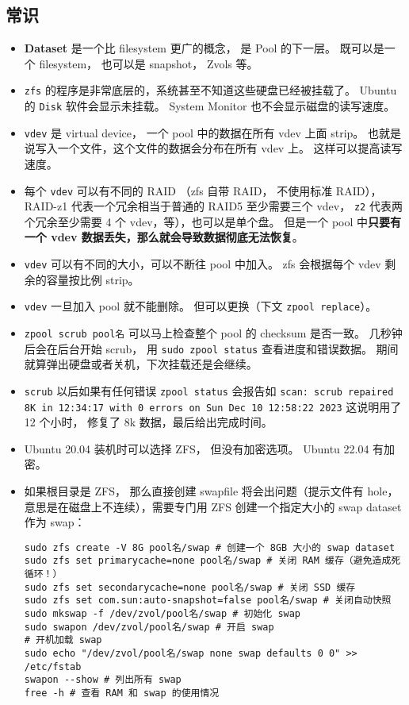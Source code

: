 \subsection{常识}
\begin{itemize}
\item \textbf{Dataset} 是一个比 filesystem 更广的概念， 是 Pool 的下一层。 既可以是一个 filesystem， 也可以是 snapshot， Zvols 等。
\item \verb|zfs| 的程序是非常底层的，系统甚至不知道这些硬盘已经被挂载了。 Ubuntu 的 \verb|Disk| 软件会显示未挂载。 System Monitor 也不会显示磁盘的读写速度。
\item \verb|vdev| 是 virtual device， 一个 pool 中的数据在所有 vdev 上面 strip。 也就是说写入一个文件，这个文件的数据会分布在所有 vdev 上。 这样可以提高读写速度。
\item 每个 \verb|vdev| 可以有不同的 RAID （zfs 自带 RAID， 不使用标准 RAID），RAID-z1 代表一个冗余相当于普通的 RAID5 至少需要三个 vdev， \verb|z2| 代表两个冗余至少需要 4 个 vdev，等），也可以是单个盘。 但是一个 pool 中\textbf{只要有一个 vdev 数据丢失，那么就会导致数据彻底无法恢复}。
\item \verb|vdev| 可以有不同的大小，可以不断往 pool 中加入。 zfs 会根据每个 vdev 剩余的容量按比例 strip。
\item \verb|vdev| 一旦加入 pool 就不能删除。 但可以更换（下文 \verb|zpool replace|）。
\item \verb|zpool scrub pool名| 可以马上检查整个 pool 的 checksum 是否一致。 几秒钟后会在后台开始 scrub， 用 \verb|sudo zpool status| 查看进度和错误数据。 期间就算弹出硬盘或者关机，下次挂载还是会继续。
\item \verb`scrub` 以后如果有任何错误 \verb`zpool status` 会报告如 \verb`scan: scrub repaired 8K in 12:34:17 with 0 errors on Sun Dec 10 12:58:22 2023` 这说明用了 12 个小时， 修复了 8k 数据，最后给出完成时间。
\item Ubuntu 20.04 装机时可以选择 ZFS， 但没有加密选项。 Ubuntu 22.04 有加密。
\item 如果根目录是 ZFS， 那么直接创建 swapfile 将会出问题（提示文件有 hole， 意思是在磁盘上不连续），需要专门用 ZFS 创建一个指定大小的 swap dataset 作为 swap：
\begin{lstlisting}[language=none]
sudo zfs create -V 8G pool名/swap # 创建一个 8GB 大小的 swap dataset
sudo zfs set primarycache=none pool名/swap # 关闭 RAM 缓存（避免造成死循环！）
sudo zfs set secondarycache=none pool名/swap # 关闭 SSD 缓存
sudo zfs set com.sun:auto-snapshot=false pool名/swap # 关闭自动快照
sudo mkswap -f /dev/zvol/pool名/swap # 初始化 swap
sudo swapon /dev/zvol/pool名/swap # 开启 swap
# 开机加载 swap
sudo echo "/dev/zvol/pool名/swap none swap defaults 0 0" >> /etc/fstab
swapon --show # 列出所有 swap
free -h # 查看 RAM 和 swap 的使用情况
\end{lstlisting}
\end{itemize}

